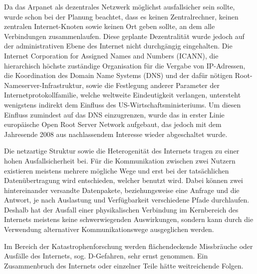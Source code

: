 Da das Arpanet als dezentrales Netzwerk möglichst ausfallsicher sein sollte, wurde schon bei der Planung beachtet, dass es keinen Zentralrechner, keinen zentralen Internet-Knoten sowie keinen Ort geben sollte, an dem alle Verbindungen zusammenlaufen. Diese geplante Dezentralität wurde jedoch auf der administrativen Ebene des Internet nicht durchgängig eingehalten. 
Die Internet Corporation for Assigned Names and Numbers (ICANN), die hierarchisch höchste zuständige Organisation für die Vergabe von IP-Adressen, die Koordination des Domain Name Systems (DNS) und der dafür nötigen Root-Nameserver-Infrastruktur, sowie die Festlegung anderer Parameter der Internetprotokollfamilie, welche weltweite Eindeutigkeit verlangen, untersteht wenigstens indirekt dem Einfluss des US-Wirtschaftsministeriums. 
Um diesen Einfluss zumindest auf das DNS einzugrenzen, wurde das in erster Linie europäische Open Root Server Network aufgebaut, das jedoch mit dem Jahresende 2008 aus nachlassendem Interesse wieder abgeschaltet wurde. 

Die netzartige Struktur sowie die Heterogenität des Internets tragen zu einer hohen Ausfallsicherheit bei. Für die Kommunikation zwischen zwei Nutzern existieren meistens mehrere mögliche Wege und erst bei der tatsächlichen Datenübertragung wird entschieden, welcher benutzt wird. 
Dabei können zwei hintereinander versandte Datenpakete, beziehungsweise eine Anfrage und die Antwort, je nach Auslastung und Verfügbarkeit verschiedene Pfade durchlaufen. Deshalb hat der Ausfall einer physikalischen Verbindung im Kernbereich des Internets meistens keine schwerwiegenden Auswirkungen, sondern kann durch die Verwendung alternativer Kommunikationswege ausgeglichen werden. 

Im Bereich der Katastrophenforschung werden flächendeckende Missbräuche oder Ausfälle des Internets, sog. D-Gefahren, sehr ernst genommen. Ein Zusammenbruch des Internets oder einzelner Teile hätte weitreichende Folgen.